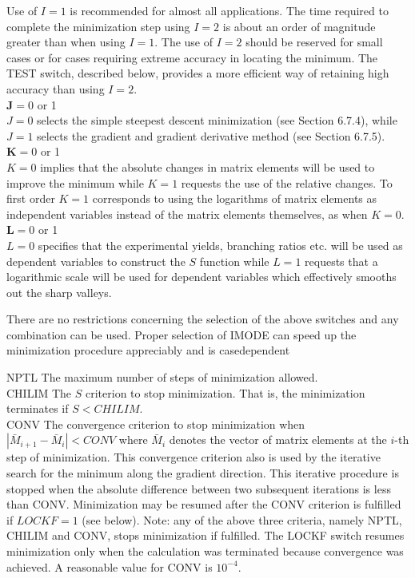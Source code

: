 \documentclass[10pt]{article}
\begin{document}
Use of $I=1$ is recommended for almost all applications. The time required to complete the minimization step using $I=2$ is about an order of magnitude greater than when using $I=1$. The use of $I=2$ should be reserved for small cases or for cases requiring extreme accuracy in locating the minimum. The TEST switch, described below, provides a more efficient way of retaining high accuracy than using $I=2$.\\
$\mathbf{J}=0$ or 1\\
$J=0$ selects the simple steepest descent minimization (see Section 6.7.4), while $J=1$ selects the gradient and gradient derivative method (see Section 6.7.5).\\
$\mathbf{K}=0$ or 1\\
$K=0$ implies that the absolute changes in matrix elements will be used to improve the minimum while $K=1$ requests the use of the relative changes. To first order $K=1$ corresponds to using the logarithms of matrix elements as independent variables instead of the matrix elements themselves, as when $K=0$.\\
$\mathbf{L}=0$ or 1\\
$L=0$ specifies that the experimental yields, branching ratios etc. will be used as dependent variables to construct the $S$ function while $L=1$ requests that a logarithmic scale will be used for dependent variables which effectively smooths out the sharp valleys.

There are no restrictions concerning the selection of the above switches and any combination can be used. Proper selection of IMODE can speed up the minimization procedure appreciably and is casedependent

NPTL The maximum number of steps of minimization allowed.\\
CHILIM The $S$ criterion to stop minimization. That is, the minimization terminates if $S<C H I L I M$.\\
CONV The convergence criterion to stop minimization when $\left|\bar{M}_{i+1}-\bar{M}_{i}\right|<C O N V$ where $\bar{M}_{i}$ denotes the vector of matrix elements at the $i$-th step of minimization. This convergence criterion also is used by the iterative search for the minimum along the gradient direction. This iterative procedure is stopped when the absolute difference between two subsequent iterations is less than CONV. Minimization may be resumed after the CONV criterion is fulfilled if $L O C K F=1$ (see below). Note: any of the above three criteria, namely NPTL, CHILIM and CONV, stops minimization if fulfilled. The LOCKF switch resumes minimization only when the calculation was terminated because convergence was achieved. A reasonable value for CONV is $10^{-4}$.
\end{document}
